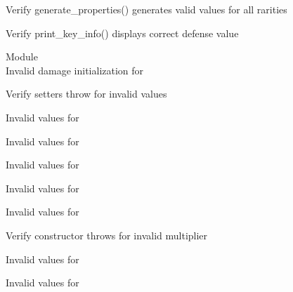\begin{DoxyRefList}
\label{test__test000029}%
%
Verify generate\+\_\+properties() generates valid values for all rarities  



\label{test__test000030}%
%
Verify print\+\_\+key\+\_\+info() displays correct defense value  


\item[Module \doxylink{group___error_handling}{Error\+Handling} ]\hfill \\
\label{test__test000010}%
%
Invalid damage initialization for   



\label{test__test000015}%
%
Verify setters throw for invalid values  



\label{test__test000022}%
%
Invalid values for   



\label{test__test000027}%
%
Invalid values for   



\label{test__test000032}%
%
Invalid values for   



\label{test__test000036}%
%
Invalid values for   



\label{test__test000041}%
%
Invalid values for   



\label{test__test000047}%
%
Verify constructor throws for invalid multiplier  



\label{test__test000049}%
%
Invalid values for   



\label{test__test000054}%
%
Invalid values for   




\end{DoxyRefList}
